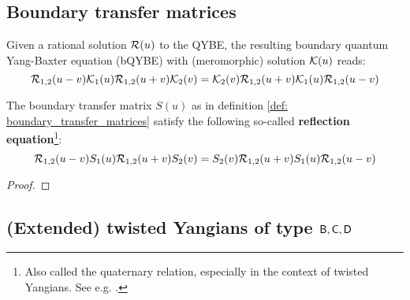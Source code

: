         \subsection{Boundary transfer matrices}
            \begin{definition} \label{def: boundary_quantum_yang_baxter_equations}
                Given a rational solution $\mathcal{R}(u)$ to the QYBE, the resulting boundary quantum Yang-Baxter equation (bQYBE) with (meromorphic) solution $\mathcal{K}(u)$ reads:
                    \begin{equation} \label{equation: boundary_quantum_yang_baxter_equations}
                        \mathcal{R}_{1, 2}(u - v) \mathcal{K}_1(u) \mathcal{R}_{1, 2}(u + v) \mathcal{K}_2(v) = \mathcal{K}_2(v) \mathcal{R}_{1, 2}(u + v) \mathcal{K}_1(u) \mathcal{R}_{1, 2}(u - v) 
                    \end{equation}
            \end{definition}
        
            \begin{definition} \label{def: boundary_transfer_matrices}
                
            \end{definition}
            \begin{lemma} \label{lemma: reflection_equations}
                The boundary transfer matrix $S(u)$ as in definition \ref{def: boundary_transfer_matrices} satisfy the following so-called \textbf{reflection equation}\footnote{Also called the quaternary relation, especially in the context of twisted Yangians. See e.g. \cite[Proposition 2.2.1]{molev_yangians_and_classical_lie_algebras}.}:
                    \begin{equation} \label{equation: reflection_equations}
                        \mathcal{R}_{1, 2}(u - v) S_1(u) \mathcal{R}_{1, 2}(u + v) S_2(v) = S_2(v) \mathcal{R}_{1, 2}(u + v) S_1(u) \mathcal{R}_{1, 2}(u - v) 
                    \end{equation}
            \end{lemma}
                \begin{proof}
                    
                \end{proof}

        \subsection{(Extended) twisted Yangians of type \texorpdfstring{$\mathsf{B}, \mathsf{C}, \mathsf{D}$}{}}
            \begin{definition} \label{def: (extended)_twisted_yangians}
                
            \end{definition}

